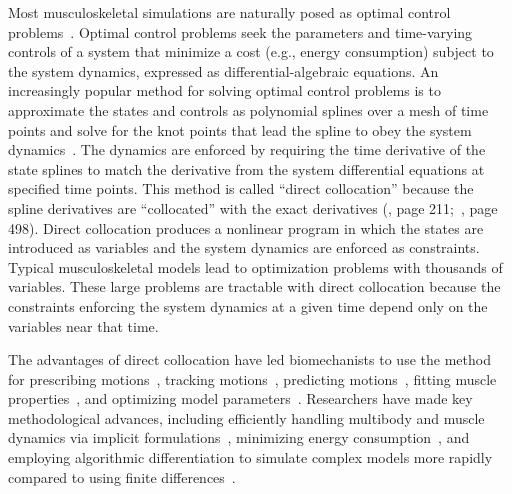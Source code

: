 \documentclass[10pt,letterpaper]{article}
\begin{document}
Most musculoskeletal simulations are naturally posed as optimal control problems~\cite{Todorov:2003}. Optimal control problems seek the parameters and time-varying controls of a system that minimize a cost (e.g., energy consumption) subject to the system dynamics, expressed as differential-algebraic equations. An increasingly popular method for solving optimal control problems is to approximate the states and controls as polynomial splines over a mesh of time points and solve for the knot points that lead the spline to obey the system dynamics~\cite{Betts:2010, Kelly:2017}. The dynamics are enforced by requiring the time derivative of the state splines to match the derivative from the system differential equations at specified time points. This method is called ``direct collocation'' because the spline derivatives are ``collocated'' with the exact derivatives (\cite{Hairer:1993}, page 211;~\cite{Hairer:1996}, page 498). Direct collocation produces a nonlinear program in which the states are introduced as variables and the system dynamics are enforced as constraints. Typical musculoskeletal models lead to optimization problems with thousands of variables. These large problems are tractable with direct collocation because the constraints enforcing the system dynamics at a given time depend only on the variables near that time.

The advantages of direct collocation have led biomechanists to use the method for prescribing motions~\cite{Groote:2016dq,Ueno:2020}, tracking motions~\cite{Kaplan:2001,Lin:2017jp,Mehrabi:2019,Koelewijn:2016bm,Meyer:2016gl}, predicting motions~\cite{Ackermann:2010dd,Ackermann:2012,Miller:2015fc,Porsa:2015dn,Lee:2016dn,Umberger:2018ec,Bobbert:2016,KMoore:2018ea,Lin:2018ex,Lai:2018,Nguyen:2019,Falisse:2019b,Jansen:2020}, fitting muscle properties~\cite{Falisse:2017}, and optimizing model parameters~\cite{Rohani:2017}. Researchers have made key methodological advances, including efficiently handling multibody and muscle dynamics via implicit formulations~\cite{vandenBogert:2011fv,Groote:2016dq}, minimizing energy consumption~\cite{Koelewijn:2018kw,Koelewijn:2019}, and employing algorithmic differentiation to simulate complex models more rapidly compared to using finite differences~\cite{Falisse:2019a}.
\end{document}
